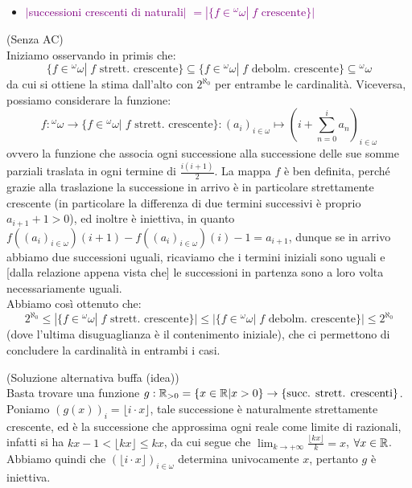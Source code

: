 \begin{itemize}
	\item \textcolor{purple}{$|$successioni crescenti di naturali$|$ $= |\{f \in {}^\omega \omega | \; \text{$f$ crescente}\}|$}
\end{itemize}

\begin{soln}
	(Senza AC)\\
	Iniziamo osservando in primis che:
	\[ \{f \in {}^{\omega}\omega | \; \text{$f$ strett. crescente}\} \subseteq \{f \in {}^{\omega}\omega | \; \text{$f$ debolm. crescente}\} \subseteq {}^{\omega}\omega
		\]
	da cui si ottiene la stima dall'alto con $2^{\aleph_0}$ per entrambe le cardinalit\`a. Viceversa, possiamo considerare la funzione:
	\[ f : {}^{\omega}\omega \to \{f \in {}^{\omega}\omega | \; \text{$f$ strett. crescente}\} : (a_i)_{i \in \omega} \mapsto \left(i + \sum_{n = 0}^i a_n\right)_{i \in \omega}
		\]
	ovvero la funzione che associa ogni successione alla successione delle sue somme parziali traslata in ogni termine di $\frac{i(i+1)}{2}$. La mappa $f$ \`e ben definita, perch\'e grazie alla traslazione la successione in arrivo \`e in particolare strettamente
	crescente (in particolare la differenza di due termini successivi \`e proprio $a_{i+1} + 1 > 0$), ed inoltre \`e iniettiva, in quanto $f((a_i)_{i \in \omega})(i+1) - f((a_i)_{i \in \omega})(i) - 1 = a_{i+1}$, dunque se in arrivo abbiamo due successioni uguali,
	ricaviamo che i termini iniziali sono uguali e [dalla relazione appena vista che] le successioni in partenza sono a loro volta necessariamente uguali.\\
	Abbiamo cos\`i ottenuto che:
	\[ 2^{\aleph_0} \leq |\{f \in {}^{\omega}\omega | \; \text{$f$ strett. crescente}\}| \leq |\{f \in {}^{\omega}\omega | \; \text{$f$ debolm. crescente}\}| \leq 2^{\aleph_0}
		\] 
	(dove l'ultima disuguaglianza \`e il contenimento iniziale), che ci permettono di concludere la cardinalit\`a in entrambi i casi.
\end{soln}

\begin{soln}
	(Soluzione alternativa buffa (idea))\\
	Basta trovare una funzione $g : \mathbb R_{>0} = \{x \in \mathbb R | x > 0\} \to \{\text{succ. strett. crescenti}\}$. Poniamo $(g(x))_{i} = \lfloor i \cdot x\rfloor$, tale successione \`e naturalmente strettamente crescente, ed \`e la successione che approssima ogni reale come limite di razionali,
	infatti si ha $kx - 1 < \lfloor kx \rfloor \leq kx$, da cui segue che $\lim_{k \to +\infty} \frac{\lfloor kx \rfloor}{k} = x$, $\forall x \in \mathbb R$. Abbiamo quindi che $(\lfloor i \cdot x \rfloor)_{i \in \omega}$ determina univocamente $x$, pertanto $g$ \`e iniettiva.
\end{soln}

